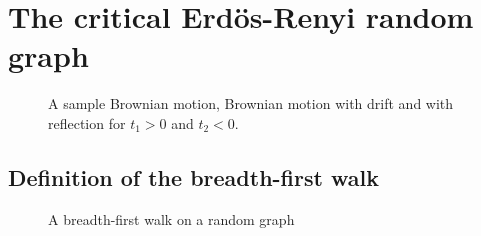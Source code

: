 
\chapter{The critical Erd\"os-Renyi random graph}

\begin{figure}%
	\centering
	\subfloat[$W(s)$]{}%
	\quad
	\subfloat[$W^{t_1}(s)$]{}%
	\quad
	\subfloat[$B^{t_1}(s)$]{}%
	\quad
	\subfloat[$W^{t_2}(s)$]{}%
	\quad
	\subfloat[$B^{t_2}(s)$]{}%
	\caption{A sample Brownian motion, Brownian motion with drift and with reflection for $t_1>0$ and $t_2<0$.}%
	\label{F: BM}%
\end{figure}

\section{Definition of the breadth-first walk}


\begin{figure}[ht]
	
	
	\caption{A breadth-first walk on a random graph}
	\label{F: bf-walk}
\end{figure}